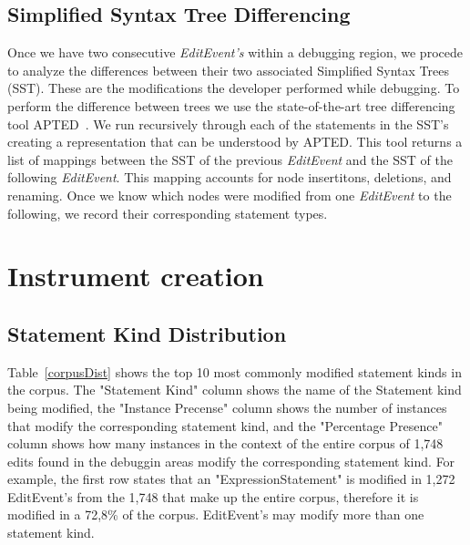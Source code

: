 \documentclass[sigconf]{acmart}
\begin{document}
\subsection{Simplified Syntax Tree Differencing}
\label{sstDiff}
Once we have two consecutive \textit{EditEvent's} within
a debugging region, we procede to analyze the differences
between their two associated Simplified Syntax Trees (SST).
These are the modifications the developer performed
while debugging.
To perform the difference between trees we use the 
state-of-the-art tree differencing
tool APTED~\cite{Pawlik16Apted}.
We run recursively through each of the statements in the 
SST's creating a representation that can be understood by
APTED. This tool returns a list of mappings between
the SST of the previous \textit{EditEvent} and the SST
of the following \textit{EditEvent}. This mapping
accounts for node insertitons, deletions, and renaming.
Once we know which nodes were modified from one \textit{EditEvent}
to the following, we record their corresponding statement types.

\section{Instrument creation}

\subsection{Statement Kind Distribution}
\label{stmtKindDistribution}
Table~\ref{corpusDist} shows the top 10 most commonly modified 
statement kinds
in the corpus. The "Statement Kind" column shows the name of the 
Statement kind being modified, the "Instance Precense" column
shows the number of instances that modify the corresponding
statement kind, and the "Percentage Presence" column shows 
how many instances in the context of the entire corpus of 
1,748 edits found in the debuggin areas modify the corresponding
statement kind. For example, the first row states that
an "ExpressionStatement" is modified in 1,272 EditEvent's from the
1,748 that make up the entire corpus, therefore  it is modified
in a 72,8\% of the corpus. EditEvent's may modify more than one
statement kind.
\end{document}
